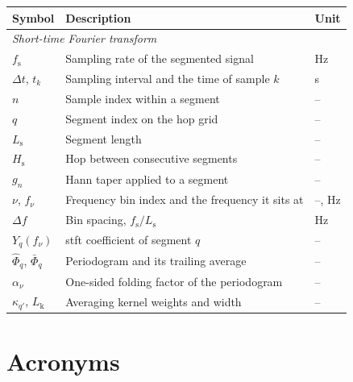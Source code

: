 \begin{tabular}{lll}
    \toprule
    Symbol & Description & Unit \\
    \midrule
    \multicolumn{3}{l}{\itshape Short-time Fourier transform} \\
    $f_\mathrm{s}$ & Sampling rate of the segmented signal & \si{\hertz} \\
    $\Delta t$, $t_k$ & Sampling interval and the time of sample $k$ & \si{\second} \\
    $n$ & Sample index within a segment & -- \\
    $q$ & Segment index on the hop grid & -- \\
    $L_\mathrm{s}$ & Segment length & -- \\
    $H_\mathrm{s}$ & Hop between consecutive segments & -- \\
    $g_n$ & Hann taper applied to a segment & -- \\
    $\nu$, $f_\nu$ & Frequency bin index and the frequency it sits at & --, \si{\hertz} \\
    $\Delta f$ & Bin spacing, $f_\mathrm{s} / L_\mathrm{s}$ & \si{\hertz} \\
    $Y_q(f_\nu)$ & \Ac{stft} coefficient of segment $q$ & -- \\
    $\hat{\Phi}_q$, $\bar{\Phi}_q$ & Periodogram and its trailing average & -- \\
    $\alpha_\nu$ & One-sided folding factor of the periodogram & -- \\
    $\kappa_{q'}$, $L_\mathrm{k}$ & Averaging kernel weights and width & -- \\
    \bottomrule
\end{tabular}

\section*{Acronyms}

\printacronyms[heading=none]

